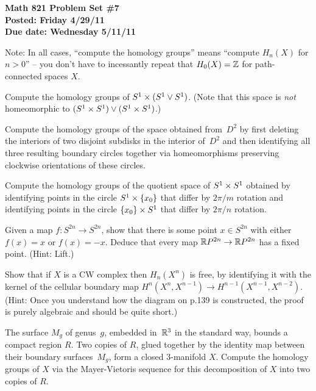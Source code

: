 
\usepackage{youngtab}

\thispagestyle{empty}
{\bf Math 821 Problem Set \#7\\
Posted: Friday 4/29/11\\
Due date: Wednesday 5/11/11}

Note: In all cases, ``compute the homology groups'' means ``compute $H_n(X)$ for $n>0$'' -- you don't have to incessantly repeat that $H_0(X)=\mathbb{Z}$ for path-connected spaces $X$.

\prob [Hatcher p.156 \#9b] Compute the homology groups of $S^1\times(S^1\vee S^1)$.
(Note that this space is \emph{not} homeomorphic to $(S^1\times S^1)\vee(S^1\times S^1)$.)

\bigskip

\prob [Hatcher p.156 \#9c] Compute the homology groups of the space obtained from~$D^2$ by first deleting the interiors of two disjoint subdisks
in the interior of~$D^2$ and then identifying all three resulting boundary circles
together via homeomorphisms preserving clockwise orientations of these circles.

\bigskip

\prob [Hatcher p.156 \#9d] Compute the homology groups of
the quotient space of $S^1\times S^1$ obtained by identifying points in the circle $S^1\times\{x_0\}$
that differ by $2\pi/m$ rotation and identifying points in the circle $\{x_0\}\times S^1$ that
differ by $2\pi/n$ rotation.

\bigskip
\newcommand{\RP}{\Rr P}
 Given a map $f:S^{2n}\to S^{2n}$, show that there is some point $x\in S^{2n}$
with either $f(x)=x$ or $f(x)=-x$.  Deduce that every map $\RP^{2n}\to\RP^{2n}$ has a fixed point.  (Hint: Lift.)

\bigskip

\prob  [Hatcher p.156 \#15] Show that if $X$ is a CW complex then $H_n(X^n)$
is free, by identifying it with the kernel of the cellular boundary map
$H^n(X^n,X^{n-1})\to H^{n-1}(X^{n-1},X^{n-2})$.  (Hint: Once you understand
how the diagram on p.139 is constructed, the proof is purely algebraic and
should be quite short.)

\bigskip

\prob [Hatcher p.158 \#29]
The surface $M_g$ of genus~$g$, embedded in~$\mathbb{R}^3$ in the standard
way, bounds a compact region $R$. Two copies of $R$, glued together by
the identity map between their boundary surfaces~$M_g$, form a closed
3-manifold $X$. Compute the homology groups of $X$ via the
Mayer-Vietoris sequence for this decomposition of $X$ into two copies
of $R$.



